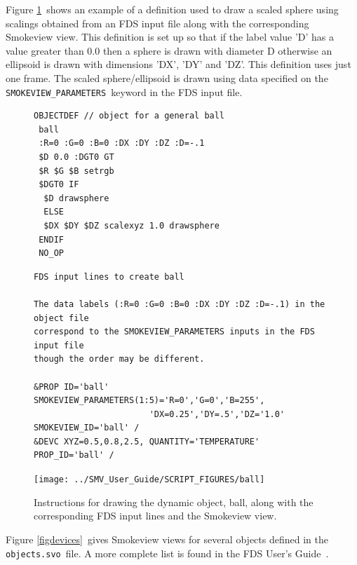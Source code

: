 \documentclass[11pt,twoside]{book}
\begin{document}
Figure \ref{figball}\ shows an example of a definition used to draw a
scaled sphere using scalings obtained from an FDS input file along
with the corresponding Smokeview view.  This definition is set up
so that if the label value 'D' has a value greater than 0.0 then a
sphere is drawn with diameter D otherwise an ellipsoid is drawn with
dimensions 'DX', 'DY' and 'DZ'. This definition uses just one frame.
The scaled sphere/ellipsoid is drawn using data specified on the
{\tt SMOKEVIEW\_PARAMETERS}\ keyword in the FDS input file.

\begin{figure}[bph]
{\small
\begin{lstlisting}[frame=single,rulecolor=\color{yellow},
framerule=1pt,framesep=1pc,fillcolor=\color{yellow}]
OBJECTDEF // object for a general ball
 ball
 :R=0 :G=0 :B=0 :DX :DY :DZ :D=-.1
 $D 0.0 :DGT0 GT
 $R $G $B setrgb
 $DGT0 IF
  $D drawsphere
  ELSE
  $DX $DY $DZ scalexyz 1.0 drawsphere
 ENDIF
 NO_OP
\end{lstlisting}
}
{\small
\begin{lstlisting}[frame=single,rulecolor=\color{yellow},
framerule=1pt,framesep=1pc,fillcolor=\color{yellow}]
FDS input lines to create ball

The data labels (:R=0 :G=0 :B=0 :DX :DY :DZ :D=-.1) in the object file
correspond to the SMOKEVIEW_PARAMETERS inputs in the FDS input file
though the order may be different.

&PROP ID='ball' SMOKEVIEW_PARAMETERS(1:5)='R=0','G=0','B=255',
                       'DX=0.25','DY=.5','DZ='1.0' SMOKEVIEW_ID='ball' /
&DEVC XYZ=0.5,0.8,2.5, QUANTITY='TEMPERATURE' PROP_ID='ball' /

\end{lstlisting}
}
\begin{center}
\texttt{[image: ../SMV\_User\_Guide/SCRIPT\_FIGURES/ball]}\\
\end{center}
\caption{Instructions for drawing the dynamic object, ball,
along with the corresponding FDS input lines and the Smokeview view.}
\label{figball}%
\end{figure}

\newcommand{\devfig}[1]{
\texttt{[image: SCRIPT\_FIGURES/\#1]}
}

Figure \ref{figdevices}\ gives Smokeview views for several objects
defined in the {\tt objects.svo}\ file. A more complete list is
found in the FDS User's Guide~\cite{FDS_Users_Guide}.
\end{document}
